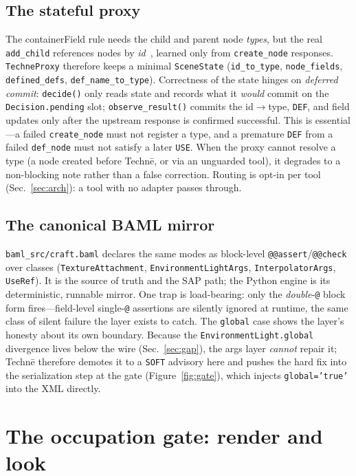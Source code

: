 \documentclass[sigconf,nonacm,screen,anonymous]{acmart}
\begin{document}
\subsection{The stateful proxy}
The containerField rule needs the child and parent node \emph{types}, but the real \texttt{add\_child} references nodes by \emph{id}~\cite{x3duom}, learned only from \texttt{create\_node} responses. \texttt{TechneProxy} therefore keeps a minimal \texttt{SceneState} (\texttt{id\_to\_type}, \texttt{node\_fields}, \texttt{defined\_defs}, \texttt{def\_name\_to\_type}). Correctness of the state hinges on \emph{deferred commit}: \texttt{decide()} only reads state and records what it \emph{would} commit on the \texttt{Decision.pending} slot; \texttt{observe\_result()} commits the id$\rightarrow$type, \texttt{DEF}, and field updates only after the upstream response is confirmed successful. This is essential---a failed \texttt{create\_node} must not register a type, and a premature \texttt{DEF} from a failed \texttt{def\_node} must not satisfy a later \texttt{USE}. When the proxy cannot resolve a type (a node created before Technē, or via an unguarded tool), it degrades to a non-blocking note rather than a false correction. Routing is opt-in per tool (Sec.~\ref{sec:arch}): a tool with no adapter passes through.

\subsection{The canonical BAML mirror}
\texttt{baml\_src/craft.baml} declares the same modes as block-level \texttt{@@assert}/\texttt{@@check} over classes (\texttt{TextureAttachment}, \texttt{EnvironmentLightArgs}, \texttt{InterpolatorArgs}, \texttt{UseRef}). It is the source of truth and the SAP path; the Python engine is its deterministic, runnable mirror. One trap is load-bearing: only the \emph{double}-\texttt{@} block form fires---field-level single-\texttt{@} assertions are silently ignored at runtime, the same class of silent failure the layer exists to catch. The \texttt{global} case shows the layer's honesty about its own boundary. Because the \texttt{EnvironmentLight.global} divergence lives below the wire (Sec.~\ref{sec:gap}), the args layer \emph{cannot} repair it; Technē therefore demotes it to a \texttt{SOFT} advisory here and pushes the hard fix into the serialization step at the gate (Figure~\ref{fig:gate}), which injects \texttt{global='true'} into the XML directly.

\section{The occupation gate: render and look}\label{sec:point3}
\end{document}
